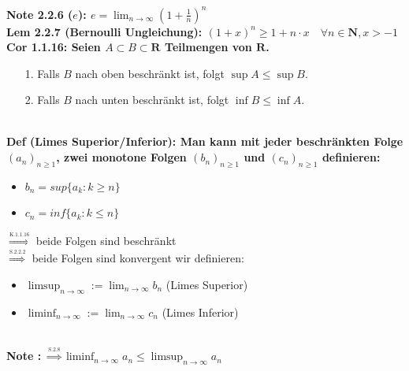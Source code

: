 \documentclass[7pt,landscape, margin = 0.1mm]{article}
\newcommand{\DEF}[2]{\color{chaptercolor}\bf{Def #1}:\color{black}    \hspace{0.2cm} #2 \\}
\newcommand{\NOTE}[2]{\color{chaptercolor}\bf{Note #1}:\color{black}    \hspace{0.2cm} #2 \\}
\newcommand{\COR}[2]{\color{chaptercolor}\bf{Cor #1}:\color{black}    \hspace{0.2cm} #2 \\}
\newcommand{\LEM}[2]{\color{chaptercolor}\bf{Lem #1}:\color{black}    \hspace{0.2cm} #2 \\}
\begin{document}
\begin{multicols}{4}
\begin{flushleft}
{\begin{itemize}
\end{itemize}}
\NOTE{2.2.6 ($e$)}{ $e = \lim_{n \to \infty}\left(1+\frac{1}{n} \right)^n$}
\LEM{2.2.7 (Bernoulli Ungleichung)}{$(1+x)^n \geqslant 1+n \cdot x \quad \forall n \in \mathbf{N}, x>-1$}
\COR{1.1.16}{ Seien $A \subset B \subset \mathbf{R}$ Teilmengen von $\mathbf{R}$.
\begin{itemize}
\item[1.] Falls $B$ nach oben beschränkt ist, folgt $\sup A \leqslant \sup B$.
\item[2.]Falls $B$ nach unten beschränkt ist, folgt $\inf B \leqslant \inf A$.
\end{itemize}
}
\DEF{(Limes Superior/Inferior)}{Man kann mit jeder beschränkten Folge $(a_n)_{n \geq 1}$, zwei monotone Folgen $(b_n)_{n \geq 1}$ und $(c_n)_{n \geq 1}$ definieren:
\begin{itemize}
\item $b_n = sup \{a_k: k \geq n \}$
\item $c_n = inf \{a_k: k \leq n \}$
\end{itemize}
$\overset{\underset{\mathrm{K.1.1.16}}{}}{\Rightarrow}$ beide Folgen sind beschränkt\\
$\overset{\underset{\mathrm{S.2.2.2}}{}}{\Rightarrow}$ beide Folgen sind konvergent
wir definieren:
\begin{itemize}
\item $\limsup_{n \to \infty} := \lim_{n \to \infty} b_n$ (Limes Superior)
\item $\liminf_{n \to \infty} := \lim_{n \to \infty} c_n$ (Limes Inferior)
\end{itemize}}

\NOTE{}{ $\overset{\underset{\mathrm{S.2.8}}{}}{\Rightarrow} \liminf_{n \to \infty } a_n \leq \limsup_{n \to \infty} a_n$}


\end{flushleft}
\end{multicols}
\end{document}
